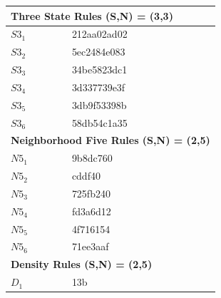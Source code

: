 \documentclass{elsarticle}
\begin{document}
\begin{multicols}{2}
\begin{table}[!htbp] \centering
\small
\begin{tabular}{|p{2cm}|l|}
\hline
\multicolumn{2}{|l|}{\textbf{Three State Rules (S,N) = (3,3)}} \\ \hline
$S3_{1}$ &  212aa02ad02\\ \hline
$S3_{2}$ &  5ec2484e083\\ \hline
$S3_{3}$ &  34be5823dc1\\ \hline
$S3_{4}$ &   3d337739e3f\\ \hline
$S3_{5}$ &   3db9f53398b\\ \hline
$S3_{6}$ &   58db54c1a35\\ \hline
\multicolumn{2}{|l|}{\textbf{Neighborhood Five Rules (S,N) = (2,5)}} \\ \hline
$N5_{1}$ &   9b8dc760\\ \hline
$N5_{2}$ &    cddf40\\ \hline
$N5_{3}$ &   725fb240\\ \hline
$N5_{4}$ &   fd3a6d12\\ \hline
$N5_{5}$ &   4f716154\\ \hline
$N5_{6}$ &   71ee3aaf\\ \hline
\multicolumn{2}{|l|}{\textbf{Density Rules (S,N) = (2,5)}} \\ \hline
$D_{1}$ &   13b \\ \hline

\end{tabular}
\end{table}
\end{multicols}
\end{document}
